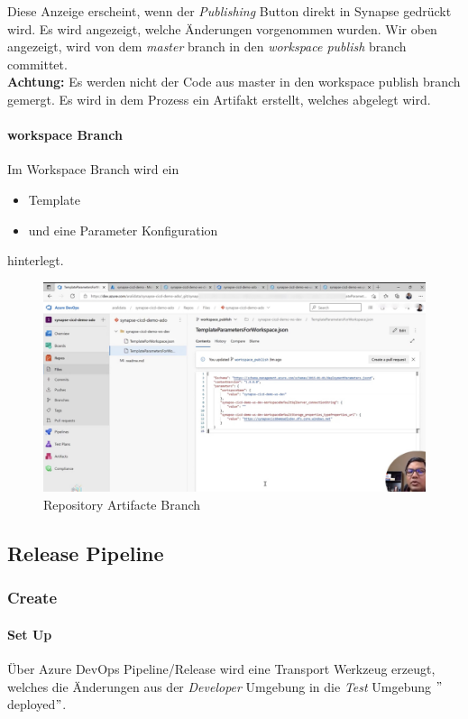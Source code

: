 Diese Anzeige erscheint, wenn der \textit{Publishing} Button direkt in Synapse gedrückt wird. Es wird angezeigt, welche Änderungen vorgenommen wurden. Wir oben angezeigt, wird von dem \textit{master} branch in den \textit{workspace publish} branch committet. \\

\textbf{Achtung:} Es werden nicht der Code aus master in den workspace publish branch gemergt. Es wird in dem Prozess ein Artifakt erstellt, welches abgelegt wird.


\paragraph{workspace Branch}
Im Workspace Branch wird ein 
\begin{itemize}
	\item Template
	\item und eine Parameter Konfiguration
\end{itemize}

hinterlegt.

\begin{figure}[H]
	\centering
	\includegraphics[scale = 0.2]{attachment/chapter_2/Scc152}
	\caption{Repository Artifacte Branch} 
\end{figure}

\subsection{Release Pipeline}
\subsubsection{Create}\label{pap_Create_a_Release_Pipeline}
\paragraph{Set Up}
Über Azure DevOps Pipeline/Release wird eine Transport Werkzeug erzeugt, welches die Änderungen aus der \textit{Developer} Umgebung in die \textit{Test} Umgebung $"$deployed$"$.\\


